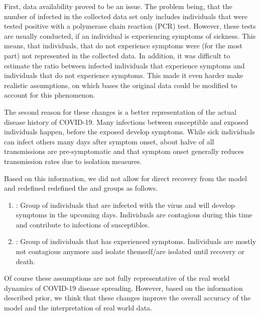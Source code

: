 \par
First, data availability proved to be an issue. The problem being, that the number of infected in the
collected data set only includes individuals that were tested positive with a polymerase chain reaction (PCR) test\cite{??}. However,
these tests are usually conducted, if an individual is experiencing symptoms of sickness\cite{??}. This means, that individuals, that do
not experience symptoms were (for the most part) not represented in the collected data. In addition, it was difficult to estimate
the ratio between infected individuals that experience symptoms and individuals that do not experience symptoms. This made it
even harder make realistic assumptions, on which bases the original data could be modified to account for this phenomenon.\newline

\par
The second reason for these changes is a better representation of the actual disease history of COVID-19. Many infections
between susceptible and exposed individuals happen, before the exposed develop symptoms. While sick individuals can infect others many
days after symptom onset, about halve of all transmissions are pre-symptomatic \cite{casey2021presymptomatic} and that symptom onset generally
reduces transmission rates due to isolation measures\cite{RKIcov}.

\par
Based on this information, we did not allow for direct recovery from the model and redefined redefined the  and  groups as follows.
\begin{enumerate}[label=$\bullet$]
	\item {}: Group of individuals that are infected with the virus and will develop symptoms in the upcoming
		days. Individuals are contagious during this time and contribute to infections of susceptibles.
	\item {}: Group of individuals that has experienced symptoms. Individuals are mostly not contagious anymore
		and isolate themself/are isolated until recovery or death.
\end{enumerate}

Of course these assumptions are not fully representative of the real world dynamics of COVID-19 disease spreading. However, based on
the information described prior, we think that these changes improve the overall accuracy of the model and the interpretation of real world data.

